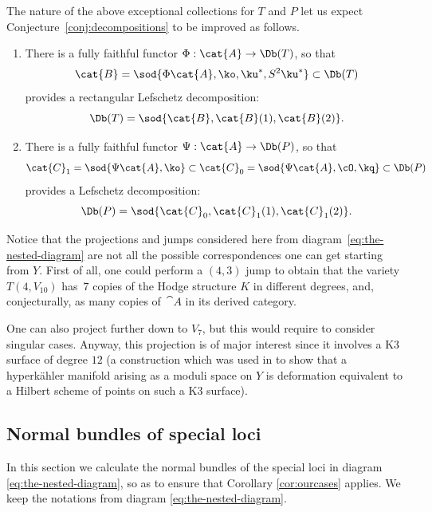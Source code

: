 The nature of the above exceptional collections for $T$ and $P$ let us expect Conjecture~\ref{conj:decompositions}
to be improved as follows.

\skpt
\begin{conjecture}\label{conj:deco-improved}
\begin{enumerate}\renewcommand{\theenumi}{\Alph{enumi}}
\setcounter{enumi}{19}\item\label{enum:T}
There is a fully faithful functor $\Phi: \cat{A} \to \Db(T)$, so that\vspace*{-3pt}
\[
\cat{B}=\sod{\Phi \cat{A},\ko,\ku^*,S^2\ku^*} \subset \Db(T)
\]
provides a rectangular Lefschetz decomposition:\vspace*{-3pt}
\[
\Db(T)=\sod{\cat{B},\cat{B}(1),\cat{B}(2)}.
\]

\setcounter{enumi}{15}\item\label{enum:P}
There is a fully faithful functor $\Psi: \cat{A} \to \Db(P)$, so that\vspace*{-3pt}
\[
\cat{C}_1=\sod{\Psi \cat{A}, \ko} \subset \cat{C}_0 = \sod{\Psi\cat{A},\cO, \kq} \subset \Db(P)
\]
provides a Lefschetz decomposition:\vspace*{-3pt}
\[
\Db(P) = \sod{\cat{C}_0,\cat{C}_1(1),\cat{C}_1(2)}.
\]
\end{enumerate}
\end{conjecture}

\begin{remark}
Notice that the projections and jumps considered here from diagram~\eqref{eq:the-nested-diagram}
are not all the possible correspondences one can get starting from $Y$. First of all, one
could perform a $(4,3)$ jump to obtain that the variety $T(4,V_{10})$ has~$7$ copies
of the Hodge structure $K$ in different degrees, and, conjecturally, as many
copies of~$\cat{A}$ in its derived category.

One can also project further down to $V_7$, but this would require to consider singular cases.
Anyway, this projection is of major interest since it involves a K3 surface of degree $12$
(a construction which was used in \cite{debarre-voisin} to show that a hyperkähler manifold
arising as a moduli space on $Y$
is deformation equivalent to a Hilbert scheme of points on such a K3 surface).
\end{remark}

\subsection{Normal bundles of special loci}
In this section we calculate the normal bundles of the special loci in diagram
\eqref{eq:the-nested-diagram}, so as to ensure that Corollary \ref{cor:ourcases} applies.
We keep the notations from diagram \eqref{eq:the-nested-diagram}.

